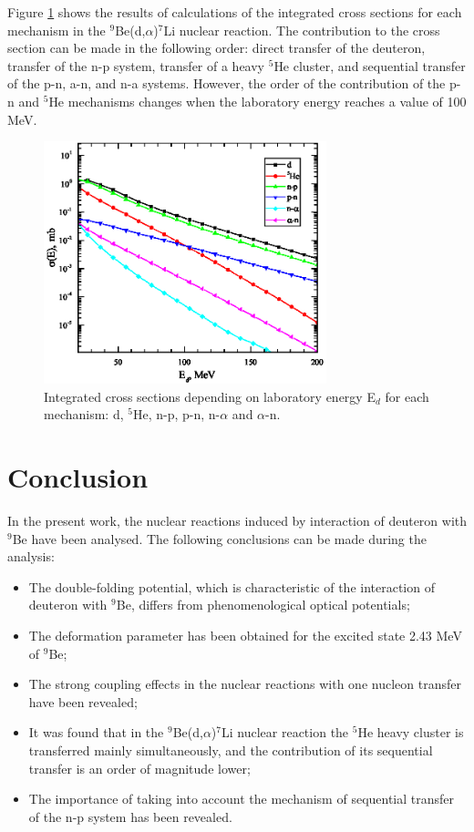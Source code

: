 \documentclass[10pt]{iopart}
\begin{document}
 Figure \ref{CS} shows the results of calculations of the integrated cross sections for each mechanism in the $^9$Be(d,$\alpha$)$^7$Li nuclear reaction. The contribution to the cross section can be made in the following order: direct transfer of the deuteron, transfer of the n-p system, transfer of a heavy $^5$He cluster,  and sequential  transfer of the p-n, a-n, and n-a systems. However, the order of the contribution of the p-n and $^5$He mechanisms changes when the laboratory energy reaches a value of 100 MeV.
 
 
 
 
 


\begin{figure}[tp]
\centering
\includegraphics[width=8.2cm]{CS.eps}
\caption{\label{CS} Integrated cross sections depending on laboratory energy E$_d$ for each mechanism: d, $^5$He, n-p, p-n, n-$\alpha$ and $\alpha$-n. }
\end{figure}	
	
\section{Conclusion}
In the present work, the nuclear reactions induced by interaction of deuteron with $^9$Be  have been analysed. The following conclusions can be made during the analysis:
\begin{itemize}
\item The double-folding potential, which is characteristic of the interaction of deuteron with $^9$Be, differs from phenomenological optical potentials;
\item  The deformation parameter has been obtained for the excited state 2.43 MeV of $^9$Be;
\item The strong coupling effects in the nuclear reactions with one nucleon transfer have been revealed;
\item It was found that  in the $^9$Be(d,$\alpha$)$^7$Li nuclear reaction the $^5$He heavy cluster  is transferred mainly simultaneously, and the contribution of its sequential transfer is an order of magnitude lower;
\item The importance of taking into account the mechanism of sequential transfer of the n-p system has been revealed.
\end{itemize}
\end{document}

